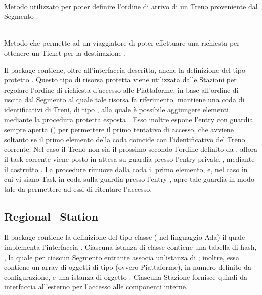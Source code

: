 \begin{description}
		\item {} \\
		Metodo utilizzato per poter definire l'ordine di arrivo di un Treno  proveniente dal Segmento .	
	
		\item {} \\
		Metodo che permette ad un viaggiatore  di poter effettuare una richiesta per ottenere un Ticket per la destinazione .
	\end{description}
	
	Il package contiene, oltre all'interfaccia descritta, anche la definizione del tipo protetto . Questo tipo di risorsa protetta viene utilizzata dalle Stazioni per regolare l'ordine di richiesta d'accesso alle Piattaforme, in base all'ordine di uscita dal Segmento al quale tale risorsa fa riferimento.  mantiene una coda  di identificativi di Treni, di tipo , alla quale è possibile aggiungere elementi mediante la procedura protetta esposta . Esso inoltre espone l'entry  con guardia sempre aperta () per permettere il primo tentativo di accesso, che avviene soltanto se il primo elemento della coda coincide con l'identificativo del Treno corrente. Nel caso il Treno non sia il prossimo secondo l'ordine definito da , allora il task corrente viene posto in attesa su guardia presso l'entry privata , mediante il costrutto . La procedure  rimuove dalla coda il primo elemento, e, nel caso in cui vi siano Task in coda sulla guardia presso l'entry , apre tale guardia in modo tale da permettere ad essi di ritentare l'accesso.

\subsection{Regional\_Station}
	
	Il package  contiene la definizione del tipo classe ( nel linguaggio Ada)  il quale implementa l'interfaccia . Ciascuna istanza di classe  contiene una tabella di hash, , la quale per ciascun Segmento entrante associa un'istanza di ; inoltre, essa contiene un array di oggetti di tipo  (ovvero Piattaforme), in numero definito da configurazione, e una istanza di oggetto . 
	Ciascuna Stazione fornisce quindi da interfaccia all'esterno per l'accesso alle componenti interne.
	
